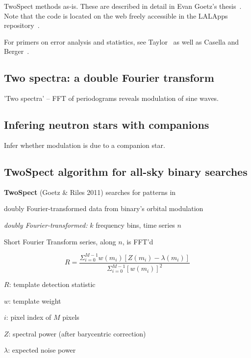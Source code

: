             TwoSpect methods as-is. These are described in detail in Evan Goetz's thesis~\cite{GoetzThesis}. Note that the code is located on the web freely accessible in the LALApps repository~\cite{LALAPPSrepo}.

For primers on error analysis and statistics, see Taylor~\cite{taylor} as well as Casella and Berger~\cite{CasellaBerger2001}.

            \subsection{Two spectra: a double Fourier transform}
            \label{two_spectra}

                'Two spectra' -- FFT of periodograms reveals modulation of sine waves.

            \subsection{Infering neutron stars with companions}
            \label{inference}
 
                Infer whether modulation is due to a companion star.



\subsection{TwoSpect algorithm for all-sky binary searches}


\textbf{TwoSpect} (Goetz \& Riles 2011) searches for patterns in


doubly Fourier-transformed data from binary's orbital modulation


\emph{doubly Fourier-transformed:} $k$ frequency bins, time series
$n$


Short Fourier Transform series, along $n$, is FFT'd 


\[
R=\frac{\Sigma_{i=0}^{M-1}w(m_{i})[Z(m_{i})-\lambda(m_{i})]}{\Sigma_{i=0}^{M-1}[w(m_{i})]^{2}}
\]



$R$: template detection statistic


$w$: template weight


$i$: pixel index of $M$ pixels


$Z$: spectral power (after barycentric correction)


$\lambda$: expected noise power


